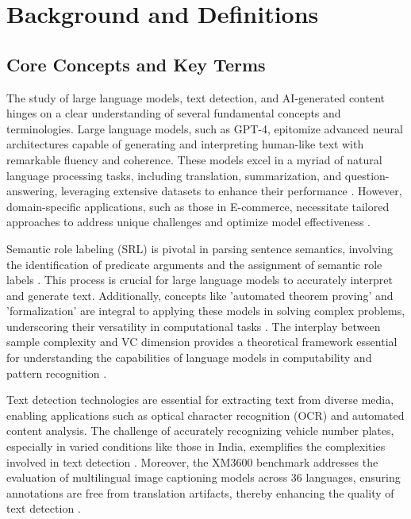 \section{Background and Definitions} \label{sec:Background and Definitions}



\subsection{Core Concepts and Key Terms} \label{subsec:Core Concepts and Key Terms}



The study of large language models, text detection, and AI-generated content hinges on a clear understanding of several fundamental concepts and terminologies. Large language models, such as GPT-4, epitomize advanced neural architectures capable of generating and interpreting human-like text with remarkable fluency and coherence. These models excel in a myriad of natural language processing tasks, including translation, summarization, and question-answering, leveraging extensive datasets to enhance their performance \cite{li2023ecomgptinstructiontuninglargelanguage}. However, domain-specific applications, such as those in E-commerce, necessitate tailored approaches to address unique challenges and optimize model effectiveness \cite{li2023ecomgptinstructiontuninglargelanguage}.



Semantic role labeling (SRL) is pivotal in parsing sentence semantics, involving the identification of predicate arguments and the assignment of semantic role labels \cite{qian2017syntaxawarelstmmodel}. This process is crucial for large language models to accurately interpret and generate text. Additionally, concepts like 'automated theorem proving' and 'formalization' are integral to applying these models in solving complex problems, underscoring their versatility in computational tasks \cite{liu2023fimochallengeformaldataset}. The interplay between sample complexity and VC dimension provides a theoretical framework essential for understanding the capabilities of language models in computability and pattern recognition \cite{ryabko2005samplecomplexitycomputationalpattern}.



Text detection technologies are essential for extracting text from diverse media, enabling applications such as optical character recognition (OCR) and automated content analysis. The challenge of accurately recognizing vehicle number plates, especially in varied conditions like those in India, exemplifies the complexities involved in text detection \cite{adak2022automaticnumberplaterecognition}. Moreover, the XM3600 benchmark addresses the evaluation of multilingual image captioning models across 36 languages, ensuring annotations are free from translation artifacts, thereby enhancing the quality of text detection \cite{thapliyal2022crossmodal3600massivelymultilingualmultimodal}.



